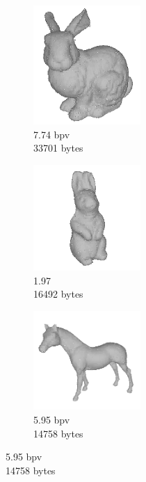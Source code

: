 \begin{figure}[t!]
        \begin{subfigure}[b]{1.9in}
                \includegraphics[width=1.6in]{images/results/compression/bunnyd}
                \caption{7.74 bpv\\33701 bytes}
                \label{fig:FIG_BUNNYD}
        \end{subfigure}%
        \begin{subfigure}[b]{1.9in}
                \includegraphics[width=1.6in]{images/results/compression/rabbitd}
                \caption{1.97\\16492 bytes}
                \label{fig:FIG_RABBITD}
        \end{subfigure}%
        \begin{subfigure}[b]{1.9in}
                \includegraphics[width=1.6in]{images/results/compression/horsed}
                \caption{5.95 bpv\\14758 bytes}
                \label{fig:FIG_HORSED}
        \end{subfigure}
        

\end{figure}
